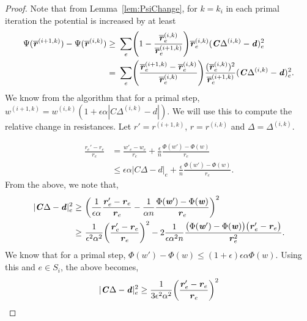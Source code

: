 \documentclass[11pt]{article}
\let\originalleft\left
\let\originalright\right
\renewcommand{\left}{\mathopen{}\mathclose\bgroup\originalleft}
\renewcommand{\right}{\aftergroup\egroup\originalright}
\newcommand\dd{\boldsymbol{\mathit{d}}}
\newcommand\rr{\boldsymbol{\mathit{r}}}
\newcommand\ww{\boldsymbol{\mathit{w}}}
\newcommand\rrbar{\overline{\boldsymbol{\mathit{r}}}}
\newcommand\CC{\boldsymbol{\mathit{C}}}
\begin{document}
\begin{proof}
Note that from Lemma~\ref{lem:PsiChange}, for $k = k_i$ in each primal iteration the potential is increased by at least
\begin{align}\label{eq:Stable1}
\Psi(\rrbar^{(i+1,k)}) - \Psi(\rrbar^{(i,k)}) \geq &~ \sum_e \left(1-\frac{\rrbar^{(i,k)}_e}{\rrbar^{(i+1,k)}_e}\right)\rrbar^{(i,k)}_e (\CC\Delta^{(i,k)}-\dd)_e^2 \nonumber\\
= &~ \sum_e \left(\frac{\rrbar_e^{\left(i + 1,k\right)}-\rrbar_e^{\left(i,k \right)}}{\rrbar_e^{\left(i,k \right)}} \right) \frac{(\rrbar_e^{(i,k)})^2}{\rrbar^{(i+1,k)}_e} (\CC\Delta^{(i,k)}-\dd)_e^2.
\end{align}
We know from the algorithm that for a primal step, $\ww^{(i+1,k)} = \ww^{(i,k)}(1+\epsilon\alpha|\CC\Delta^{(i,k)}-\dd|)$. We will use this to compute the relative change in resistances. Let $\rr' = \rr^{(i+1,k)}$, $\rr = \rr^{(i,k)}$ and $\Delta = \Delta^{(i,k)}$.

\begin{align*}
    \frac{\rr_e'-\rr_e}{\rr_e}& = \frac{\ww'_e - \ww_e}{\rr_e} + \frac{\epsilon}{n}\frac{\Phi(\ww')-\Phi(\ww)}{\rr_e}\\
    & \leq \epsilon\alpha |\CC\Delta-\dd|_e + \frac{\epsilon}{n}\frac{\Phi(\ww')-\Phi(\ww)}{\rr_e}.
\end{align*}
From the above, we note that,
\begin{align*}
|\CC\Delta-\dd|_e^2 \geq &~ \left(\frac{1}{\epsilon\alpha}\frac{\rr_e'-\rr_e}{\rr_e} - \frac{1}{\alpha n}\frac{\Phi(\ww')-\Phi(\ww)}{\rr_e}\right)^2 \\
\geq &~ \frac{1}{\epsilon^2\alpha^2}\left(\frac{\rr_e'-\rr_e}{\rr_e}\right)^2 - 2\frac{1}{\epsilon\alpha^2 n}\frac{\left(\Phi(\ww')-\Phi(\ww)\right)\left(\rr_e'-\rr_e\right)}{\rr_e^2}.
\end{align*}
We know that for a primal step, $\Phi(\ww')-\Phi(\ww)\leq (1+\epsilon)\epsilon \alpha \Phi(\ww)$. Using this and $e \in S_i$, the above becomes, 
\[
|\CC\Delta-\dd|_e^2 \geq \frac{1}{3\epsilon^2\alpha^2}\left(\frac{\rr_e'-\rr_e}{\rr_e}\right)^2
\]


\end{proof}
\end{document}
